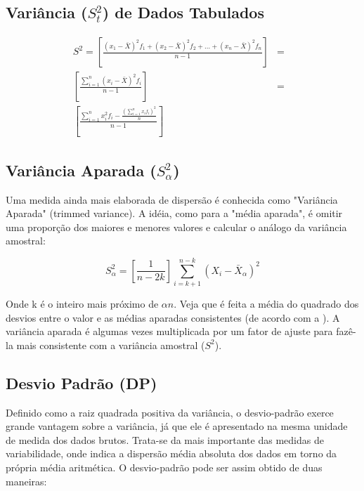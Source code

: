 \subsection{Variância ($S^{2}_{t}$) de Dados Tabulados}


\begin{eqnarray}\nonumber
S^{2} = \left[ \frac{(x_{1}-\bar{X})^{2}f_{1}+(x_{2}-\bar{X})^{2}f_{2}+\ldots+(x_{n}-\bar{X})^{2}f_{n}}{n-1} \right]
    & = &  \\
    \left[ \frac{\sum_{i=1}^{n}(x_{i}-\bar{X})^{2}f_{i}}{n-1} \right]  & = &  \\ \nonumber
    \left[ \frac{\sum_{i=1}^{n}x_{i}^{2}f_{i}-\frac{(\sum_{i=1}^{n}x_{i}f_{i})^{2}}{n}}{n-1} \right] &  &
\end{eqnarray}



\subsection{Variância Aparada ($S_{\alpha}^{2}$)}

Uma medida ainda mais elaborada de dispersão é conhecida como "Variância Aparada" (trimmed variance). A idéia, como para a "média aparada", é omitir uma proporção dos maiores e menores valores e calcular o análogo da variância amostral:

\begin{equation}\label{varAparada}
    S_{\alpha}^{2} = \left[\frac{1}{n-2k}\right]\sum_{i=k+1}^{n-k}(X_{i}-\bar{X}_{\alpha})^{2}
\end{equation}


Onde k é o inteiro mais próximo de $\alpha n$. Veja que é feita a média do quadrado dos desvios entre o valor e as médias aparadas consistentes (de acordo com a \label{aparada}). A variância aparada é algumas vezes multiplicada por um fator de ajuste para fazê-la mais consistente com a variância amostral ($S^{2}$).


\subsection{Desvio Padrão (DP)}

Definido como a raiz quadrada positiva da variância, o desvio-padrão exerce grande vantagem sobre a variância, já que ele é apresentado na mesma unidade de medida dos dados brutos. Trata-se da mais importante das medidas de variabilidade, onde indica a dispersão média absoluta dos dados em torno da própria média aritmética. O desvio-padrão pode ser assim obtido de duas maneiras:\vskip0.3cm

